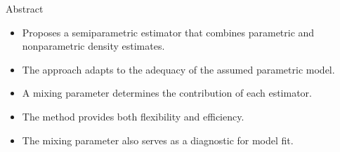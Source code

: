 \begin{frame}{Abstract}
\begin{itemize}
    \item Proposes a semiparametric estimator that combines parametric and nonparametric density estimates.
    \item The approach adapts to the adequacy of the assumed parametric model.
    \item A mixing parameter determines the contribution of each estimator.
    \item The method provides both flexibility and efficiency.
    \item The mixing parameter also serves as a diagnostic for model fit.
\end{itemize}
\end{frame}
